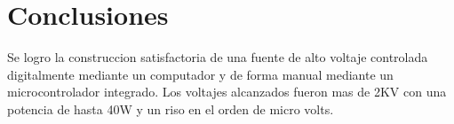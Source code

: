 \chapter{Conclusiones}
Se logro la construccion satisfactoria de una fuente de alto voltaje controlada digitalmente mediante un computador y de forma manual mediante un microcontrolador integrado. Los voltajes alcanzados fueron mas de 2KV con una potencia de hasta 40W y un riso en el orden de micro volts.